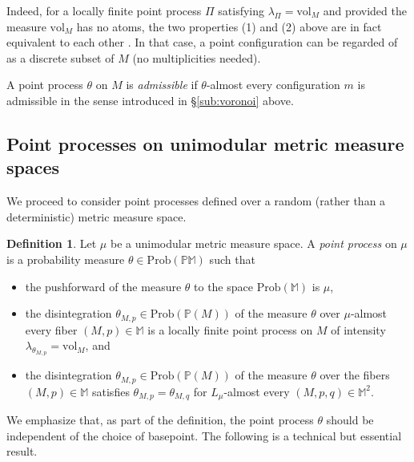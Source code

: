 \documentclass{amsart}
\newcommand{\MM}{\mathbb{M}}
\newcommand{\MP}{\mathbb{PM}}
\newcommand{\Points}{\mathbb{P}}
\newcommand{\vol}{\mathrm{vol}}
\theoremstyle{plain}
\numberwithin{equation}{section}
\theoremstyle{definition}
\newtheorem{definition}[theorem]{Definition}
\begin{document}
Indeed, for a locally finite point process $\Pi$  satisfying  $\lambda_\Pi=\vol_M$ and provided the measure $\vol_M$ has no atoms,  the two  properties (1) and (2)  above are in fact equivalent to each other \cite[Chapter 6]{last2017lectures}. In that case, a point configuration can be regarded of as a discrete subset of $M$ (no multiplicities needed).

A point process $\theta$ on $M$ is \emph{admissible} if $\theta$-almost every configuration $m$ is admissible in the sense introduced in \S\ref{sub:voronoi} above.

\subsection{Point processes on unimodular metric measure spaces}

We proceed to consider point processes defined over a random (rather than a deterministic) metric measure space.

\begin{definition}
\label{def:point process over unimodular}
Let $\mu$ be a unimodular metric measure space.
A \emph{point process} on $\mu$ 
is a probability measure $\theta \in \mathrm{Prob}(\MP)$ such that
\begin{itemize}
\item the pushforward of the measure $\theta$ to the space $\mathrm{Prob}(\MM)$ is $\mu$, 
\item the disintegration $\theta_{M,p} \in \mathrm{Prob}(\Points(M))$ of the measure $\theta$ over $\mu$-almost every fiber $(M,p) \in \MM$ is a locally finite point process on $M$ of intensity $\lambda_{\theta_{M,p}} = \mathrm{vol}_M$, and
\item the disintegration $\theta_{M,p} \in \mathrm{Prob}(\Points(M))$ of the measure $\theta$ over the  fibers $(M,p) \in \MM$ satisfies $\theta_{M,p} = \theta_{M,q}$
for $L_\mu$-almost every $(M,p,q) \in \MM^2$.
\end{itemize}
\end{definition}

We emphasize that, as part of the definition, the point process $\theta$ should be independent of the choice of basepoint.
The following is a technical but essential result.
\end{document}
